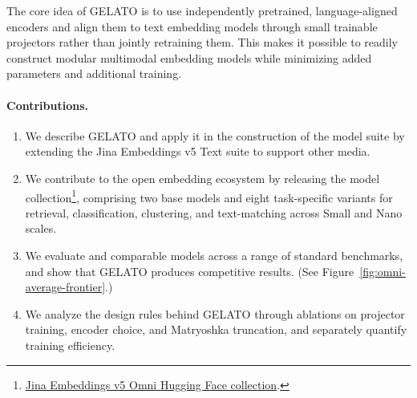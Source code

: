 The core idea of GELATO is to use independently pretrained, language-aligned encoders and align them to text embedding models through small trainable projectors rather than jointly retraining them. This makes it possible to readily construct modular multimodal embedding models while minimizing added parameters and additional training.

\paragraph{Contributions.}
\begin{enumerate}
  \item We describe GELATO and apply it in the construction of the \omniBase{} model suite by extending the Jina Embeddings v5 Text suite to support other media.
  \item We contribute to the open embedding ecosystem by releasing the \omniBase{} model collection\footnote{\href{https://huggingface.co/collections/jinaai/jina-embeddings-v5-omni-69f336b985c156b1d757029e}{Jina Embeddings v5 Omni Hugging Face collection}.}, comprising two base models and eight task-specific variants for retrieval, classification, clustering, and text-matching across Small and Nano scales.
  \item We evaluate \omniBase{} and comparable models across a range of standard benchmarks, and show that GELATO produces competitive results. (See Figure~\ref{fig:omni-average-frontier}.)
  \item We analyze the design rules behind GELATO through ablations on projector training, encoder choice, and Matryoshka truncation, and separately quantify training efficiency.
\end{enumerate}

